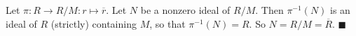 Let $\pi : R \to R/M : r \mapsto \overline{r}$. Let $N$ be a nonzero ideal of $R/M$. Then $\pi^{-1}(N)$ is an ideal of $R$ (strictly) containing $M$, so that $\pi^{-1}(N)=R$. So $N= R/M = \overline{R}$. 
 $\blacksquare$